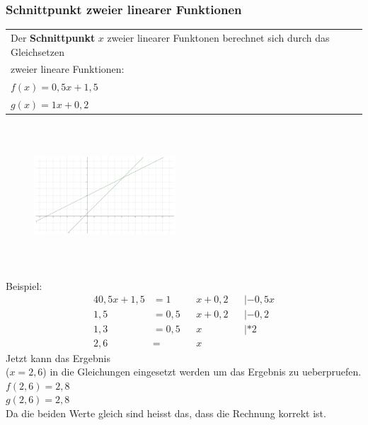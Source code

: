 \documentclass[a4paper]{article} %
\begin{document}
	\subsubsection{Schnittpunkt zweier linearer Funktionen}
		\begin{tabular}[t]{llr}
			Der \textbf{Schnittpunkt} $x$ zweier linearer Funktonen berechnet sich durch das Gleichsetzen\\ zweier lineare Funktionen:\\
			$f(x) = 0,5x+1,5$\\
			$g(x) = 1x+0,2$

		\end{tabular}

		\begin{minipage}{0.5\textwidth}
			\begin{figure}[H]
				\includegraphics[width=200px, height=200px]{lineare2.pdf}
					\captionsetup{labelformat=empty}
				\caption{  }

			\end{figure}
		\end{minipage} \hfill
		\begin{minipage}{0.45\textwidth}
				Beispiel:
			\begin{alignat*}{4}
			0,5x+1,5 &= 1 && x +0,2 && |-0,5x \\
			1,5 	 &= 0,5 && x+0,2 && |-0,2\\
			1,3 	 &= 0,5 && x &&|*2 \\
			2,6		 &=  && x
			\end{alignat*}
				Jetzt kann das Ergebnis\\($x=2,6$) in die Gleichungen eingesetzt werden um das Ergebnis zu ueberpruefen.\\
				$f(2,6) = 2,8$\\
				$g(2,6) = 2,8$\\
				Da die beiden Werte gleich sind heisst das, dass die Rechnung korrekt ist.


		\end{minipage}
	\newpage
\end{document}
